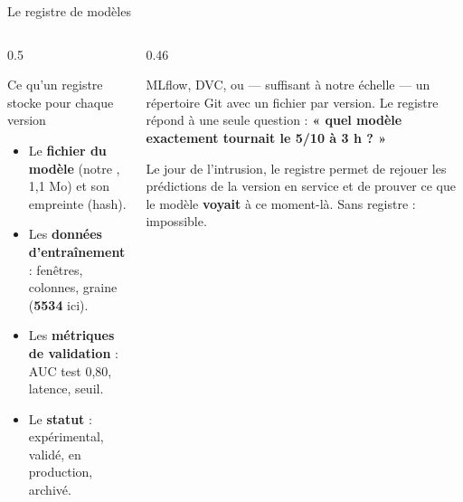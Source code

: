 \begin{frame}{Le registre de modèles}
\begin{columns}[t]
\begin{column}{0.5\textwidth}
\begin{block}{Ce qu'un registre stocke pour chaque version}
\begin{itemize}
\item Le \textbf{fichier du modèle} (notre , 1,1 Mo) et son
empreinte (hash).
\item Les \textbf{données d'entraînement} : fenêtres, colonnes, graine
(\textbf{5534} ici).
\item Les \textbf{métriques de validation} : AUC test 0,80, latence, seuil.
\item Le \textbf{statut} : expérimental, validé, en production, archivé.
\end{itemize}
\end{block}
\end{column}
\begin{column}{0.46\textwidth}
\begin{ebox}
MLflow, DVC, ou --- suffisant à notre échelle --- un répertoire Git avec un
fichier  par version. Le registre répond à une seule
question : \textbf{« quel modèle exactement tournait le 5/10 à 3 h ? »}
\end{ebox}
\begin{wbox}
Le jour de l'intrusion, le registre permet de rejouer les prédictions de la
version en service et de prouver ce que le modèle \textbf{voyait} à ce
moment-là. Sans registre : impossible.
\end{wbox}
\end{column}
\end{columns}
\end{frame}

